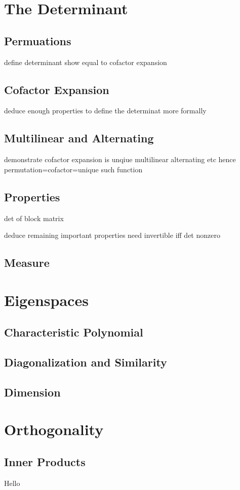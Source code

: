 \documentclass[oneside, 12pt]{book}
\theoremstyle{definition}
\begin{document}
\chapter{The Determinant}
\section{Permuations}
define determinant
show equal to cofactor expansion
\section{Cofactor Expansion}
deduce enough properties to define the determinat more formally
\section{Multilinear and Alternating}
demonstrate cofactor expansion is unqiue multilinear alternating etc
hence permutation=cofactor=unique such function
\section{Properties}
det of block matrix

deduce remaining important properties
need invertible iff det nonzero
\section{Measure}
\chapter{Eigenspaces}
\section{Characteristic Polynomial}
\section{Diagonalization and Similarity}
\section{Dimension}
\chapter{Orthogonality}
\section{Inner Products}
Hello
\end{document}
